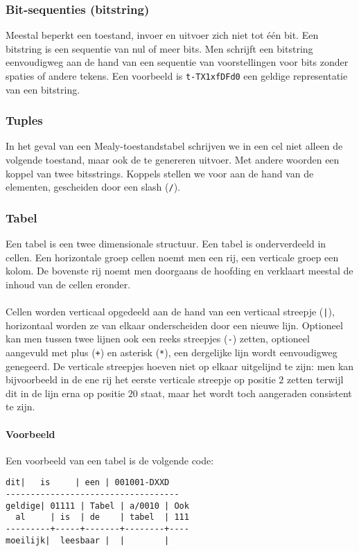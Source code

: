 \subsubsection{Bit-sequenties (bitstring)}
Meestal beperkt een toestand, invoer en uitvoer zich niet tot \'e\'en bit. Een bitstring is een sequentie van nul of meer bits. Men schrijft een bitstring eenvoudigweg aan de hand van een sequentie van voorstellingen voor bits zonder spaties of andere tekens. Een voorbeeld is \texttt{t-TX1xfDFd0} een geldige representatie van een bitstring.
\subsubsection{Tuples}
In het geval van een Mealy-toestandstabel schrijven we in een cel niet alleen de volgende toestand, maar ook de te genereren uitvoer. Met andere woorden een koppel van twee bitsstrings. Koppels stellen we voor aan de hand van de elementen, gescheiden door een slash (\verb+/+).
\subsubsection{Tabel}
Een tabel is een twee dimensionale structuur. Een tabel is onderverdeeld in cellen. Een horizontale groep cellen noemt men een rij, een verticale groep een kolom. De bovenste rij noemt men doorgaans de hoofding en verklaart meestal de inhoud van de cellen eronder.
\paragraph{}
Cellen worden verticaal opgedeeld aan de hand van een verticaal streepje (\texttt{|}), horizontaal worden ze van elkaar onderscheiden door een nieuwe lijn. Optioneel kan men tussen twee lijnen ook een reeks streepjes (\texttt{-}) zetten, optioneel aangevuld met plus (\texttt{+}) en asterisk (\texttt{*}), een dergelijke lijn wordt eenvoudigweg genegeerd. De verticale streepjes hoeven niet op elkaar uitgelijnd te zijn: men kan bijvoorbeeld in de ene rij het eerste verticale streepje op positie $2$ zetten terwijl dit in de lijn erna op positie $20$ staat, maar het wordt toch aangeraden consistent te zijn.
\paragraph{Voorbeeld}
Een voorbeeld van een tabel is de volgende code:
\begin{verbatim}
dit|   is     | een | 001001-DXXD
-----------------------------------
geldige| 01111 | Tabel | a/0010 | Ook
  al     | is  | de    | tabel  | 111
---------+-----+-------+--------+----
moeilijk|  leesbaar |  |        |
\end{verbatim}

